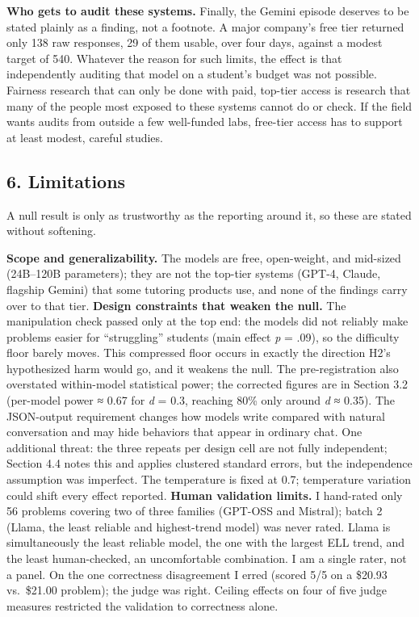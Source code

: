 \documentclass[
]{article}
\begin{document}
\textbf{Who gets to audit these systems.} Finally, the Gemini episode
deserves to be stated plainly as a finding, not a footnote. A major
company's free tier returned only 138 raw responses, 29 of them usable,
over four days, against a modest target of 540. Whatever the reason for
such limits, the effect is that independently auditing that model on a
student's budget was not possible. Fairness research that can only be
done with paid, top-tier access is research that many of the people most
exposed to these systems cannot do or check. If the field wants audits
from outside a few well-funded labs, free-tier access has to support at
least modest, careful studies.

\hypertarget{limitations}{%
\subsection{6. Limitations}\label{limitations}}

A null result is only as trustworthy as the reporting around it, so
these are stated without softening.

\textbf{Scope and generalizability.} The models are free, open-weight,
and mid-sized (24B--120B parameters); they are not the top-tier systems
(GPT-4, Claude, flagship Gemini) that some tutoring products use, and
none of the findings carry over to that tier. \textbf{Design constraints
that weaken the null.} The manipulation check passed only at the top
end: the models did not reliably make problems easier for ``struggling''
students (main effect \emph{p} = .09), so the difficulty floor barely
moves. This compressed floor occurs in exactly the direction H2's
hypothesized harm would go, and it weakens the null. The
pre-registration also overstated within-model statistical power; the
corrected figures are in Section 3.2 (per-model power ≈ 0.67 for
\emph{d} = 0.3, reaching 80\% only around \emph{d} ≈ 0.35). The
JSON-output requirement changes how models write compared with natural
conversation and may hide behaviors that appear in ordinary chat. One
additional threat: the three repeats per design cell are not fully
independent; Section 4.4 notes this and applies clustered standard
errors, but the independence assumption was imperfect. The temperature
is fixed at 0.7; temperature variation could shift every effect
reported. \textbf{Human validation limits.} I hand-rated only 56
problems covering two of three families (GPT-OSS and Mistral); batch 2
(Llama, the least reliable and highest-trend model) was never rated.
Llama is simultaneously the least reliable model, the one with the
largest ELL trend, and the least human-checked, an uncomfortable
combination. I am a single rater, not a panel. On the one correctness
disagreement I erred (scored 5/5 on a \$20.93 vs.~\$21.00 problem); the
judge was right. Ceiling effects on four of five judge measures
restricted the validation to correctness alone.
\end{document}
